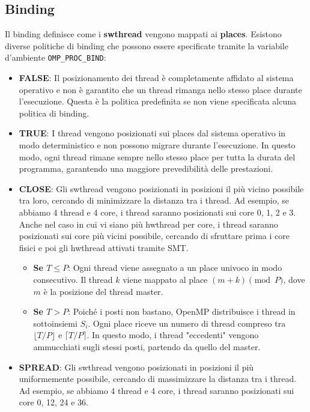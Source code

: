 \subsection{Binding}
Il binding definisce come i \textbf{swthread} vengono mappati ai \textbf{places}. Esistono diverse politiche di binding che possono essere specificate tramite la variabile d'ambiente \texttt{OMP\_PROC\_BIND}:
\begin{itemize}
    \item \textbf{FALSE}: Il posizionamento dei thread è completamente affidato al sistema operativo e non è garantito che un thread rimanga nello stesso place durante l'esecuzione. Questa è la politica predefinita se non viene specificata alcuna politica di binding. 
    \item \textbf{TRUE}: I thread vengono posizionati sui places dal sistema operativo in modo deterministico e non possono migrare durante l'esecuzione. In questo modo, ogni thread rimane sempre nello stesso place per tutta la durata del programma, garantendo una maggiore prevedibilità delle prestazioni.
    \item \textbf{CLOSE}: Gli swthread vengono posizionati in posizioni il più vicino possibile tra loro, cercando di minimizzare la distanza tra i thread. Ad esempio, se abbiamo 4 thread e 4 core, i thread saranno posizionati sui core 0, 1, 2 e 3. Anche nel caso in cui vi siano più hwthread per core, i thread saranno posizionati sui core più vicini possibile, cercando di sfruttare prima i core fisici e poi gli hwthread attivati tramite SMT.
    \begin{itemize}
        \item \textbf{Se $T \le P$}: Ogni thread viene assegnato a un place univoco in modo consecutivo. Il thread $k$ viene mappato al place $(m+k) \pmod P$, dove $m$ è la posizione del thread master.
        \item \textbf{Se $T > P$}: Poiché i posti non bastano, OpenMP distribuisce i thread in sottoinsiemi $S_i$. Ogni place riceve un numero di thread compreso tra $\lfloor T/P \rfloor$ e $\lceil T/P \rceil$. In questo modo, i thread "eccedenti" vengono ammucchiati sugli stessi posti, partendo da quello del master.
    \end{itemize}
    \item \textbf{SPREAD}: Gli swthread vengono posizionati in posizioni il più uniformemente possibile, cercando di massimizzare la distanza tra i thread. Ad esempio, se abbiamo 4 thread e 4 core, i thread saranno posizionati sui core 0, 12, 24 e 36.
    \begin{itemize}

\end{itemize}
\end{itemize}
